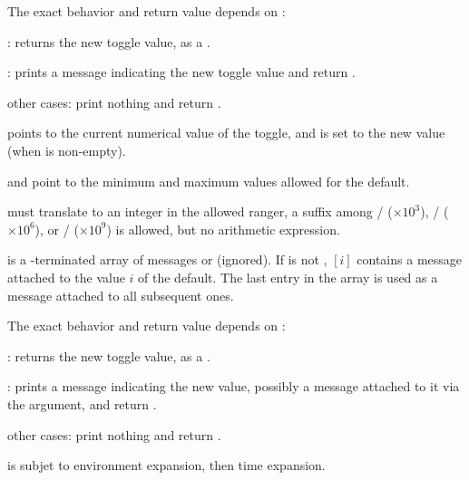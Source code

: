 The exact behavior and return value depends on :

\item {}: returns the new toggle value, as a .

\item {}: prints a message indicating the new toggle value
and return .

\item other cases: print nothing and return .



\item {} points to the current numerical value of the toggle, and is set
to the new value (when  is non-empty).

\item {} and  point to the minimum and maximum values allowed
for the default.

\item {} must translate to an integer in the allowed ranger, a suffix
among
/ ($\times 10^3$),
/ ($\times 10^6$),
or
/ ($\times 10^9$) is allowed, but no arithmetic expression.

\item {} is a \kbd[NULL]-terminated array of messages or 
(ignored). If  is not , $[i]$ contains
a message attached to the value $i$ of the default. The last entry in the
 array is used as a message attached to all subsequent ones.

The exact behavior and return value depends on :

\item {}: returns the new toggle value, as a .

\item {}: prints a message indicating the new value,
possibly a message attached to it via the  argument, and return
.

\item other cases: print nothing and return .

\item {} is subjet to environment expansion, then time expansion.

